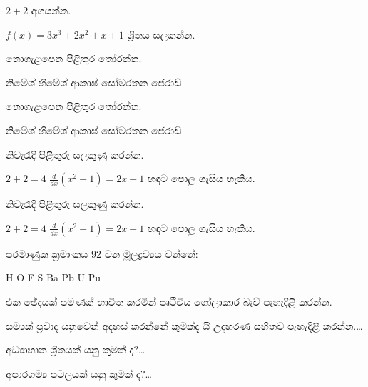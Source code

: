 \documentclass[12pt]{exam}
\begin{document}
\begin{questions}

\question[1] $2+2$ අගයන්න.
\addpoints

\question[20] $f(x)=3x^3+2x^2+x+1$ ශ්‍රිතය සලකන්න.
\noaddpoints %
\addpoints

\question[2] නොගැළපෙන පිළිතුර තෝරන්න.
\begin{choices}
\choice නිමේශ්
\choice හිමේශ්
\choice ආකාෂ්
\choice සෝමරතන
\choice ජෙරාඩ්
\end{choices}

\question[2] නොගැළපෙන පිළිතුර තෝරන්න.
\begin{oneparchoices}
\choice නිමේශ්
\choice හිමේශ්
\choice ආකාෂ්
\choice සෝමරතන
\choice ජෙරාඩ්
\end{oneparchoices}

\question[3] නිවැරැදි පිළිතුරු සලකුණු කරන්න.
\addpoints
\begin{checkboxes}
\choice $2+2=4$
\choice $\frac{d}{dx} (x^2+1) = 2x+1$
\choice හඳට පොලු ගැසිය හැකිය.
\end{checkboxes}

{%
\checkboxchar{$\Box$} %
\question[3] නිවැරැදි පිළිතුරු සලකුණු කරන්න.
\addpoints
\begin{checkboxes}
\choice $2+2=4$
\choice $\frac{d}{dx} (x^2+1) = 2x+1$
\choice හඳට පොලු ගැසිය හැකිය.
\end{checkboxes}
}%

{%
\renewcommand*\thechoice{\arabic{choice}} 
\renewcommand*\choicelabel{\thechoice)}
%
\question[2] පරමාණුක ක්‍රමාංකය 92 වන මූලද්‍රව්‍යය වන්නේ:
\begin{multicols}{2}
\begin{choices}
\choice H
\choice O
\choice F
\choice S
\choice Ba
\choice Pb
\choice U
\choice Pu
\end{choices}
\end{multicols}
}%

\question[10]
එක ඡේදයක් පමණක් භාවිත කරමින් පෘථිවිය ගෝලාකාර බැව් පැහැදිළි කරන්න.
\makeemptybox{2in}

\question[20]
සම්‍යක් ප්‍රවාද යනුවෙන් අදහස් කරන්නේ කුමක්දැ යි උදාහරණ සහිතව පැහැදිළි කරන්න.\ldots
\makeemptybox{\fill}

\newpage

\question[20]
අධ්‍යාහෘත ශ්‍රිතයක් යනු කුමක් ද?\ldots
\fillwithlines{\fill}

\newpage

\question[20]
අපාරගම්‍ය පටලයක් යනු කුමක් ද?\ldots
\fillwithdottedlines{8em}

\end{questions}
\end{document}
